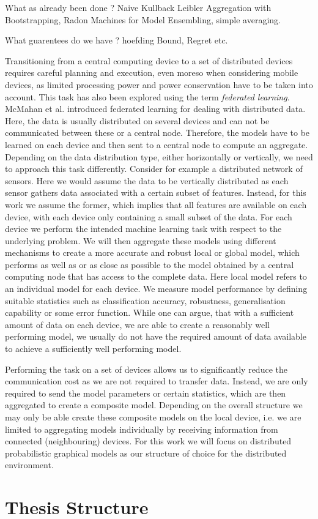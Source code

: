 What as already been done ?
Naive Kullback Leibler Aggregation with Bootstrapping, Radon Machines for Model Ensembling, simple averaging.

What guarentees do we have ? 
hoefding Bound, Regret etc.

Transitioning from a central computing device to a set of distributed devices requires careful planning and execution, even moreso when considering mobile devices, as limited processing power and power conservation have to be taken into account.
This task has also been explored using the term \textit{federated learning}.
McMahan et al. \cite{mcmahan2016communication} introduced federated learning for dealing with distributed data.
Here, the data is usually distributed on several devices and can not be communicated between these or a central node. 
Therefore, the models have to be learned on each device and then sent to a central node to compute an aggregate.
Depending on the data distribution type, either horizontally or vertically, we need to approach this task differently. 
Consider for example a distributed network of sensors.
Here we would assume the data to be vertically distributed as each sensor gathers data associated with a certain subset of features.
Instead, for this work we assume the former, which implies that all features are available on each device, with each device only containing a small subset of the data.
For each device we perform the intended machine learning task with respect to the underlying problem.
We will then aggregate these models using different mechanisms to create a more accurate and robust local or global model, which performs as well as or as close as possible to the model obtained by a central computing node that has access to the complete data.
Here local model refers to an individual model for each device.
We measure model performance by defining suitable statistics such as classification accuracy, robustness, generalisation capability or some error function.
While one can argue, that with a sufficient amount of data on each device, we are able to create a reasonably well performing model, we usually do not have the required amount of data available to achieve a sufficiently well performing model.

Performing the task on a set of devices allows us to significantly reduce the communication cost as we are not required to transfer data.
Instead, we are only required to send the model parameters or certain statistics, which are then aggregated to create a composite model.
Depending on the overall structure we may only be able create these composite models on the local device, i.e. we are limited to aggregating models individually by receiving information from connected (neighbouring) devices.
For this work we will focus on distributed probabilistic graphical models as our structure of choice for the distributed environment.
\section{Thesis Structure}